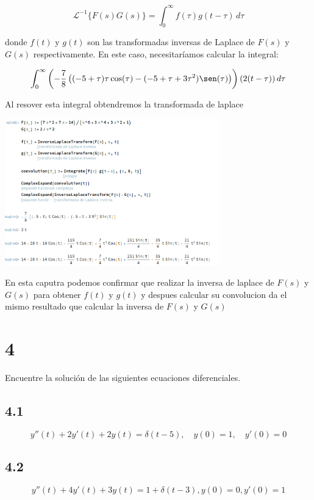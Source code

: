 \documentclass{article}
\begin{document}
\[
    \mathcal{L}^{-1}\{F(s)G(s)\} = \int_0^{\infty} f(\tau)g(t - \tau) \, d\tau
\]

donde $f(t)$ y $g(t)$ son las transformadas inversas de Laplace de $F(s)$ y $G(s)$ respectivamente. En este caso, necesitaríamos calcular la integral:

\[
    \int_0^{\infty} \left(-\frac{7}{8} \left((-5 + \tau) \tau\cos(\tau) - (-5+\tau+3\tau^2)\sen(\tau)\right)\right)(2(t - \tau)) \, d\tau
\]

Al resover esta integral obtendremos la transformada de laplace

\begin{center}
    \includegraphics[width=0.7\textwidth]{./image3.png}
\end{center}

En esta caputra podemos confirmar que realizar la inversa de laplace de $F(s)$ y $G(s)$ para obtener $f(t)$ y $g(t)$ y despues calcular su convolucion da el mismo resultado que calcular la inversa de $F(s)$ y $G(s)$

\section{4}
Encuentre la solución de las siguientes ecuaciones diferenciales.

\subsection{4.1}

\[
    y''(t) + 2y'(t) + 2y(t) = \delta(t-5), \quad y(0)=1, \quad y'(0)=0
\]
\subsection{4.2}

\[
    y''(t) + 4y'(t) + 3y(t) = 1 + \delta(t-3), y(0)=0, y'(0) = 1
\]
\end{document}
